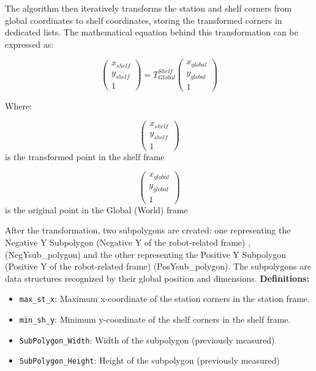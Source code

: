 The algorithm then iteratively transforms the station and shelf corners from global coordinates to shelf coordinates, 
storing the transformed corners in dedicated lists. 
The mathematical equation behind this transformation can be expressed as:

\begin{equation}
\begin{pmatrix}
x_{shelf} \\
y_{shelf} \\
1
\end{pmatrix}
=
T_{Global}^{Shelf}
\begin{pmatrix}
x_{global} \\
y_{global} \\
1
\end{pmatrix}
\end{equation}

Where:

\begin{equation}
\begin{pmatrix}
x_{shelf} \\
y_{shelf} \\
1
\end{pmatrix}
\end{equation}
is the transformed point in the shelf frame 

\begin{equation}
\begin{pmatrix}
x_{global} \\
y_{global} \\
1
\end{pmatrix}
\end{equation}
is the original point in the Global (World) frame

After the transformation, two subpolygons are created: one 
representing the Negative Y Subpolygon (Negative Y of the robot-related frame) ,(NegYsub\_polygon) and the other representing the 
Positive Y Subpolygon (Positive Y of the robot-related frame)
(PosYsub\_polygon). 
The subpolygons are data structures recognized by their global position and dimensions.
\newline \textbf{Definitions:}

\begin{itemize}
    \item \texttt{max\_st\_x}: Maximum x-coordinate of the station corners in the station frame.
    \item \texttt{min\_sh\_y}: Minimum y-coordinate of the shelf corners in the shelf frame.
    \item \texttt{SubPolygon\_Width}: Width of the subpolygon (previously measured)
    \item \texttt{SubPolygon\_Height}: Height of the subpolygon (previously measured)
\end{itemize}

